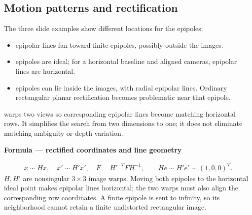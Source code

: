 \documentclass[letterpaper,11pt,english,openany,oneside]{jupyterBook}
\begin{document}
\subsection{Motion patterns and rectification}
\label{\detokenize{lectures/lecture02/two-view:motion-patterns-and-rectification}}
\sphinxAtStartPar
The three slide examples show different locations for the epipoles:
\begin{itemize}
\item {}
\sphinxAtStartPar
{} epipolar lines fan toward finite epipoles, possibly outside the images.

\item {}
\sphinxAtStartPar
{} epipoles are ideal; for a horizontal baseline and aligned cameras, epipolar lines are horizontal.

\item {}
\sphinxAtStartPar
{} epipoles can lie inside the images, with radial epipolar lines. Ordinary rectangular planar rectification becomes problematic near that epipole.

\end{itemize}

\sphinxAtStartPar
{} warps two views so corresponding epipolar lines become matching horizontal rows. It simplifies the search from two dimensions to one; it does not eliminate matching ambiguity or depth variation.

\begin{TextbookBox}
\textbf{Formula — rectified coordinates and line geometry}\par\smallskip
\begin{equation}\label{equation:lectures/lecture02/two-view:eq-lec02-rectify}
\begin{split}\bar x\sim Hx,\quad \bar x'\sim H'x',\quad
\bar F=H'^{-T}FH^{-1},\qquad
He\sim H'e'\sim(1,0,0)^T.\end{split}
\end{equation}
\sphinxAtStartPar
\(H,H'\) are nonsingular \(3\times3\) image warps. Moving both epipoles to the horizontal ideal point makes epipolar lines horizontal; the two warps must also align the corresponding row coordinates. A finite epipole is sent to infinity, so its neighborhood cannot retain a finite undistorted rectangular image.

\end{TextbookBox}
\end{document}
